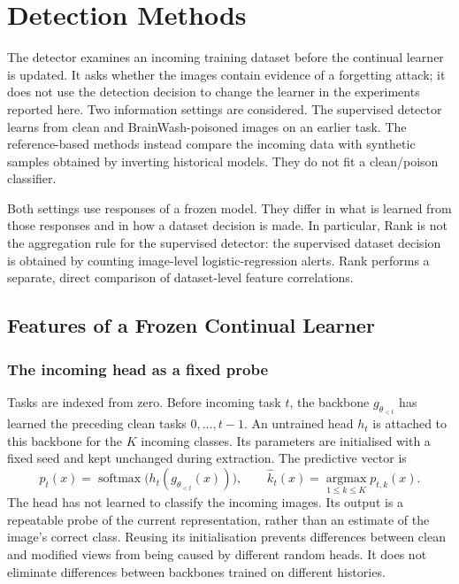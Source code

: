 
\section{Detection Methods}
\label{sec:methods}

The detector examines an incoming training dataset before the continual
learner is updated. It asks whether the images contain evidence of a
forgetting attack; it does not use the detection decision to change the
learner in the experiments reported here. Two information settings are
considered. The supervised detector learns from clean and BrainWash-poisoned
images on an earlier task. The reference-based methods instead compare the
incoming data with synthetic samples obtained by inverting historical
models. They do not fit a clean/poison classifier.

Both settings use responses of a frozen model. They differ in what is learned
from those responses and in how a dataset decision is made. In particular,
Rank is not the aggregation rule for the supervised detector: the supervised
dataset decision is obtained by counting image-level logistic-regression
alerts. Rank performs a separate, direct comparison of dataset-level feature
correlations.

\subsection{Features of a Frozen Continual Learner}
\label{subsec:methods-features}

\subsubsection{The incoming head as a fixed probe}

Tasks are indexed from zero. Before incoming task $t$, the backbone
$g_{\theta_{<t}}$ has learned the preceding clean tasks
$0,\ldots,t-1$. An untrained head $h_t$ is attached to this backbone for the
$K$ incoming classes. Its parameters are initialised with a fixed seed and
kept unchanged during extraction. The predictive vector is
\begin{equation}
    p_t(x)=\operatorname{softmax}
    \bigl(h_t(g_{\theta_{<t}}(x))\bigr),
    \qquad
    \widehat{k}_t(x)=\operatorname*{argmax}_{1\leq k\leq K}p_{t,k}(x).
    \label{eq:methods-probe}
\end{equation}
The head has not learned to classify the incoming images. Its output is a
repeatable probe of the current representation, rather than an estimate of
the image's correct class. Reusing its initialisation prevents differences
between clean and modified views from being caused by different random
heads. It does not eliminate differences between backbones trained on
different histories.


